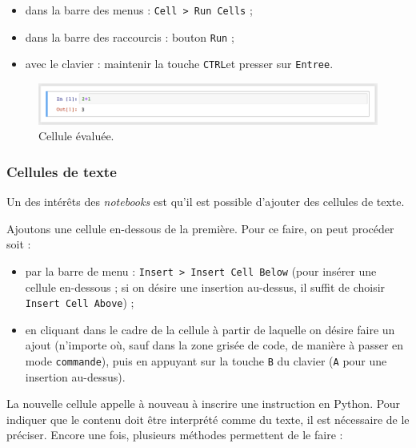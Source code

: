 \documentclass[12pt,]{book}
\providecommand{\tightlist}{%
  \setlength{\itemsep}{0pt}\setlength{\parskip}{0pt}}
\numberwithin{equation}{section}
\numberwithin{countremarque}{section}
\begin{document}
\begin{itemize}
\tightlist
\item
  dans la barre des menus : \texttt{Cell\ \textgreater{}\ Run\ Cells} ;
\item
  dans la barre des raccourcis : bouton \texttt{Run} ;
\item
  avec le clavier : maintenir la touche \texttt{CTRL}et presser sur
  \texttt{Entree}.
\end{itemize}

\begin{figure}[H]

{\centering \includegraphics[width=1\linewidth]{figs/jupyter_notebook_2} 

}

\caption{Cellule évaluée.}\label{fig:unnamed-chunk-9}
\end{figure}

\subsubsection{Cellules de texte}\label{cellules-de-texte}

Un des intérêts des \emph{notebooks} est qu'il est possible d'ajouter
des cellules de texte.

Ajoutons une cellule en-dessous de la première. Pour ce faire, on peut
procéder soit :

\begin{itemize}
\tightlist
\item
  par la barre de menu :
  \texttt{Insert\ \textgreater{}\ Insert\ Cell\ Below} (pour insérer une
  cellule en-dessous ; si on désire une insertion au-dessus, il suffit
  de choisir \texttt{Insert\ Cell\ Above}) ;
\item
  en cliquant dans le cadre de la cellule à partir de laquelle on désire
  faire un ajout (n'importe où, sauf dans la zone grisée de code, de
  manière à passer en mode \texttt{commande}), puis en appuyant sur la
  touche \texttt{B} du clavier (\texttt{A} pour une insertion
  au-dessus).
\end{itemize}

La nouvelle cellule appelle à nouveau à inscrire une instruction en
Python. Pour indiquer que le contenu doit être interprété comme du
texte, il est nécessaire de le préciser. Encore une fois, plusieurs
méthodes permettent de le faire :
\end{document}

